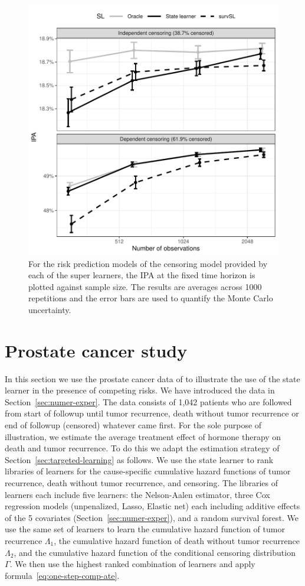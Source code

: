 \begin{figure}
  \centering %
  \includegraphics[width=.7\linewidth]{experiment-fig-sl-survSL-cens.pdf}
  \caption[]{For the risk prediction models of the censoring model provided by
    each of the super learners, the IPA at the fixed time horizon is plotted
    against sample size. The results are averages across 1000 repetitions and
    the error bars are used to quantify the Monte Carlo uncertainty.}
  \label{fig:zelefski-cens}
\end{figure}


\section{Prostate cancer study}
\label{sec:real-data-appl}

In this section we use the prostate cancer data of
\cite{kattan2000pretreatment} to illustrate the use of the state
learner in the presence of competing risks. We have introduced the
data in Section~\ref{sec:numer-exper}. The data consists of 1,042
patients who are followed from start of followup until tumor
recurrence, death without tumor recurrence or end of followup
(censored) whatever came first. For the sole purpose of illustration,
we estimate the average treatment effect of hormone therapy on death
and tumor recurrence. To do this we adapt the estimation strategy of
Section~\ref{sec:targeted-learning} as follows. We use the state
learner to rank libraries of learners for the cause-specific
cumulative hazard functions of tumor recurrence, death without tumor
recurrence, and censoring.  The libraries of learners each include
five learners: the Nelson-Aalen estimator, three Cox regression models
(unpenalized, Lasso, Elastic net) each including additive effects of
the 5 covariates (Section~\ref{sec:numer-exper}), and a random
survival forest. We use the same set of learners to learn the
cumulative hazard function of tumor recurrence \( \Lambda_1 \), the
cumulative hazard function of death without tumor recurrence
\( \Lambda_2 \), and the cumulative hazard function of the conditional
censoring distribution $\Gamma$.  We then use the highest ranked
combination of learners and apply
formula~\eqref{eq:one-step-comp-ate}.

